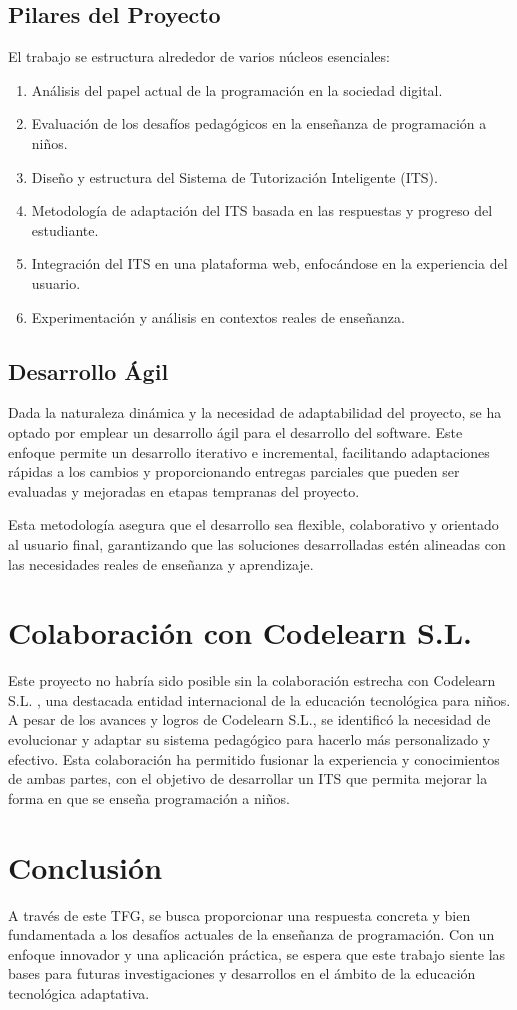 \subsection{Pilares del Proyecto}
El trabajo se estructura alrededor de varios núcleos esenciales:

\begin{enumerate}
\item Análisis del papel actual de la programación en la sociedad digital.
\item Evaluación de los desafíos pedagógicos en la enseñanza de programación a niños.
\item Diseño y estructura del Sistema de Tutorización Inteligente (ITS).
\item Metodología de adaptación del ITS basada en las respuestas y progreso del estudiante.
\item Integración del ITS en una plataforma web, enfocándose en la experiencia del usuario.
\item Experimentación y análisis en contextos reales de enseñanza.
\end{enumerate}

\subsection{Desarrollo Ágil}
Dada la naturaleza dinámica y la necesidad de adaptabilidad del proyecto, se ha optado por emplear un desarrollo ágil para el desarrollo del software. Este enfoque permite un desarrollo iterativo e incremental, facilitando adaptaciones rápidas a los cambios y proporcionando entregas parciales que pueden ser evaluadas y mejoradas en etapas tempranas del proyecto.

Esta metodología asegura que el desarrollo sea flexible, colaborativo y orientado al usuario final, garantizando que las soluciones desarrolladas estén alineadas con las necesidades reales de enseñanza y aprendizaje.

\section{Colaboración con Codelearn S.L.}
Este proyecto no habría sido posible sin la colaboración estrecha con Codelearn S.L.  \cite{codelearn}, una destacada entidad internacional de la educación tecnológica para niños. A pesar de los avances y logros de Codelearn S.L., se identificó la necesidad de evolucionar y adaptar su sistema pedagógico para hacerlo más personalizado y efectivo. Esta colaboración ha permitido fusionar la experiencia y conocimientos de ambas partes, con el objetivo de desarrollar un ITS que permita mejorar la forma en que se enseña programación a niños.

\section{Conclusión}
A través de este TFG, se busca proporcionar una respuesta concreta y bien fundamentada a los desafíos actuales de la enseñanza de programación. Con un enfoque innovador y una aplicación práctica, se espera que este trabajo siente las bases para futuras investigaciones y desarrollos en el ámbito de la educación tecnológica adaptativa.